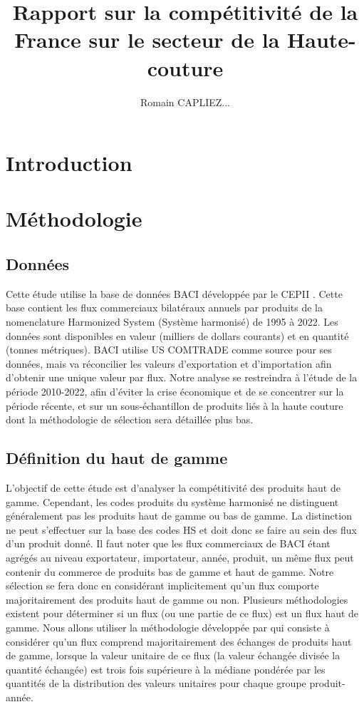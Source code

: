 \documentclass[french,10pt,a4paper]{article}
\title{Rapport sur la compétitivité de la France sur le secteur de la Haute-couture}
\author{Romain CAPLIEZ...}
\begin{document}
\maketitle

\section{Introduction}

\section{Méthodologie}

\subsection{Données}

Cette étude utilise la base de données BACI développée par le CEPII \citep{Gaulier2010}. Cette base contient les flux commerciaux bilatéraux annuels par produits de la nomenclature Harmonized System (Système harmonisé) de 1995 à 2022. Les données sont disponibles en valeur (milliers de dollars courants) et en quantité (tonnes métriques). BACI utilise US COMTRADE comme source pour ses données, mais va réconcilier les valeurs d'exportation et d'importation afin d'obtenir une unique valeur par flux. Notre analyse se restreindra à l'étude de la période 2010-2022, afin d'éviter la crise économique et de se concentrer sur la période récente, et sur un sous-échantillon de produits liés à la haute couture dont la méthodologie de sélection sera détaillée plus bas.

\subsection{Définition du haut de gamme}

L'objectif de cette étude est d'analyser la compétitivité des produits haut de gamme. Cependant, les codes produits du système harmonisé ne distinguent généralement pas les produits haut de gamme ou bas de gamme. La distinction ne peut s'effectuer sur la base des codes HS et doit donc se faire au sein des flux d'un produit donné. Il faut noter que les flux commerciaux de BACI étant agrégés au niveau exportateur, importateur, année, produit, un même flux peut contenir du commerce de produits bas de gamme et haut de gamme. Notre sélection se fera donc en considérant implicitement qu'un flux comporte majoritairement des produits haut de gamme ou non. Plusieurs méthodologies existent pour déterminer si un flux (ou une partie de ce flux) est un flux haut de gamme. Nous allons utiliser la méthodologie développée par \cite{Fontagne1997} qui consiste à considérer qu'un flux comprend majoritairement des échanges de produits haut de gamme, lorsque la valeur unitaire de ce flux (la valeur échangée divisée la quantité échangée) est trois fois supérieure à la médiane pondérée par les quantités de la distribution des valeurs unitaires pour chaque groupe produit-année.
\end{document}
